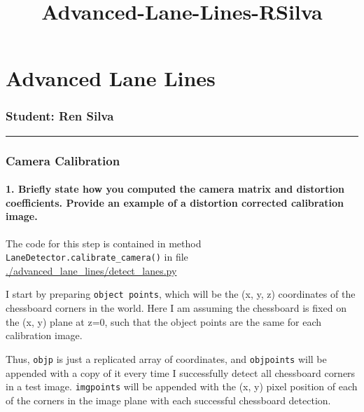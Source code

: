 \documentclass[11pt]{article}
\title{Advanced-Lane-Lines-RSilva}
\begin{document}
    
    
    \maketitle
    
    

    
    \hypertarget{advanced-lane-lines}{%
\section{Advanced Lane Lines}\label{advanced-lane-lines}}

\hypertarget{student-ren-silva}{%
\subsubsection{Student: Ren Silva}\label{student-ren-silva}}

\begin{center}\rule{0.5\linewidth}{\linethickness}\end{center}

    \hypertarget{camera-calibration}{%
\subsubsection{Camera Calibration}\label{camera-calibration}}

\hypertarget{briefly-state-how-you-computed-the-camera-matrix-and-distortion-coefficients.-provide-an-example-of-a-distortion-corrected-calibration-image.}{%
\paragraph{1. Briefly state how you computed the camera matrix and
distortion coefficients. Provide an example of a distortion corrected
calibration
image.}\label{briefly-state-how-you-computed-the-camera-matrix-and-distortion-coefficients.-provide-an-example-of-a-distortion-corrected-calibration-image.}}

The code for this step is contained in method
\texttt{LaneDetector.calibrate\_camera()} in file
\href{./advanced-lane-lines/detect-lanes.py}{./advanced\_lane\_lines/detect\_lanes.py}

I start by preparing \texttt{object\ points}, which will be the (x, y,
z) coordinates of the chessboard corners in the world. Here I am
assuming the chessboard is fixed on the (x, y) plane at z=0, such that
the object points are the same for each calibration image.

Thus, \texttt{objp} is just a replicated array of coordinates, and
\texttt{objpoints} will be appended with a copy of it every time I
successfully detect all chessboard corners in a test image.
\texttt{imgpoints} will be appended with the (x, y) pixel position of
each of the corners in the image plane with each successful chessboard
detection.
\end{document}
